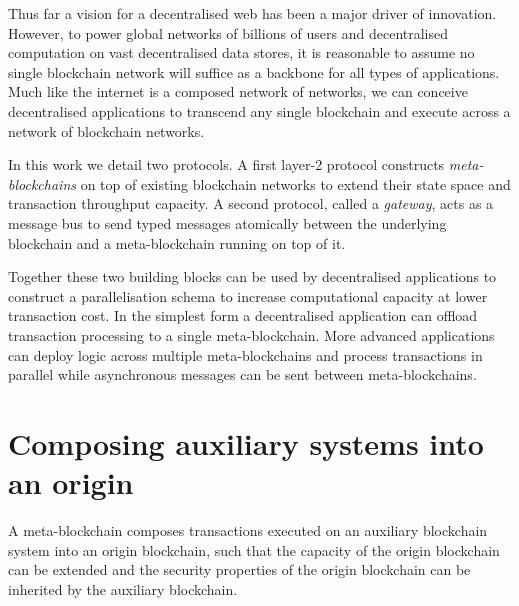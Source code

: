 \documentclass[12pt,a4paper]{article}
\begin{document}

Thus far a vision for a decentralised web has been a major driver of innovation. However, to power global networks of billions of users and decentralised computation on vast decentralised data stores, it is reasonable to assume no single blockchain network will suffice as a backbone for all types of applications. Much like the internet is a composed network of networks, we can conceive decentralised applications to transcend any single blockchain and execute across a network of blockchain networks.

In this work we detail two protocols. A first layer-2 protocol constructs \emph{meta-blockchains} on top of existing blockchain networks to extend their state space and transaction throughput capacity. A second protocol, called a \emph{gateway}, acts as a message bus to send typed messages atomically between the underlying blockchain and a meta-blockchain running on top of it.

Together these two building blocks can be used by decentralised applications to construct a parallelisation schema to increase %
computational capacity at lower transaction cost.  In the simplest form a decentralised application can offload transaction processing to a single meta-blockchain. More advanced applications can deploy logic across multiple meta-blockchains and process transactions in parallel while asynchronous messages can be sent between meta-blockchains.



\section{Composing auxiliary systems into an origin}

A meta-blockchain composes transactions executed on an auxiliary blockchain system into an origin blockchain, such that the capacity of the origin blockchain can be extended and the security properties of the origin blockchain can be inherited by the auxiliary blockchain.
\end{document}
